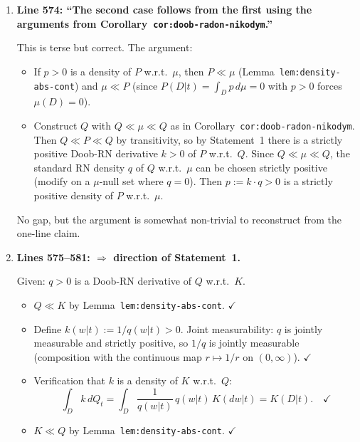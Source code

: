 \documentclass{article}
\begin{document}
\begin{enumerate}[leftmargin=*]
  \item \textbf{Line 574: ``The second case follows from the first using the arguments
        from Corollary~\texttt{cor:doob-radon-nikodym}.''}

    This is terse but correct.  The argument:
    \begin{itemize}
      \item[$\Rightarrow$:] If $p>0$ is a density of $P$ w.r.t.\ $\mu$, then
            $P \ll \mu$ (Lemma~\texttt{lem:density-abs-cont}) and
            $\mu \ll P$ (since $P(D|t) = \int_D p\,d\mu = 0$ with $p>0$
            forces $\mu(D)=0$).
      \item[$\Leftarrow$:] Construct $Q$ with $Q \ll \mu \ll Q$ as in
            Corollary~\texttt{cor:doob-radon-nikodym}.  Then
            $Q \ll P \ll Q$ by transitivity, so by Statement~1 there is a
            strictly positive Doob-RN derivative $k>0$ of $P$ w.r.t.\ $Q$.
            Since $Q \ll \mu \ll Q$, the standard RN density $q$ of $Q$ w.r.t.\
            $\mu$ can be chosen strictly positive (modify on a $\mu$-null set
            where $q=0$).  Then $p := k\cdot q > 0$ is a strictly positive
            density of $P$ w.r.t.\ $\mu$.
    \end{itemize}
    No gap, but the argument is somewhat non-trivial to reconstruct from the
    one-line claim.

  \item \textbf{Lines 575--581: $\Rightarrow$ direction of Statement~1.}

    Given: $q > 0$ is a Doob-RN derivative of $Q$ w.r.t.\ $K$.
    \begin{itemize}
      \item $Q \ll K$ by Lemma~\texttt{lem:density-abs-cont}.  $\checkmark$
      \item Define $k(w|t) := 1/q(w|t) > 0$.  Joint measurability: $q$ is
            jointly measurable and strictly positive, so $1/q$ is jointly
            measurable (composition with the continuous map $r\mapsto 1/r$
            on $(0,\infty)$).  $\checkmark$
      \item Verification that $k$ is a density of $K$ w.r.t.\ $Q$:
            \[ \int_D k\,dQ_t = \int_D \frac{1}{q(w|t)}\,q(w|t)\,K(dw|t)
                              = K(D|t). \quad\checkmark \]
      \item $K \ll Q$ by Lemma~\texttt{lem:density-abs-cont}.  $\checkmark$
    \end{itemize}


\end{enumerate}
\end{document}
